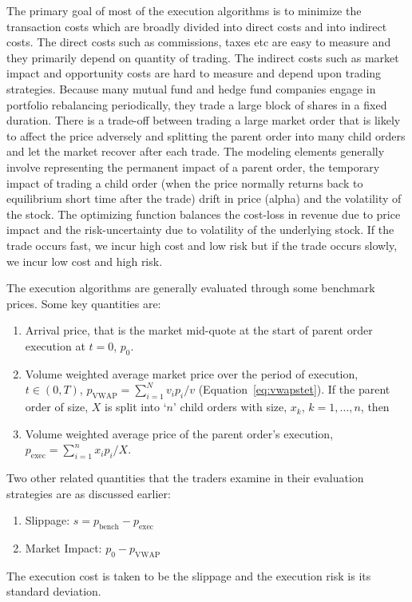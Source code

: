 The primary goal of most of the execution algorithms is to minimize the transaction costs which are broadly divided into direct costs and into indirect costs. The direct costs such as commissions, taxes etc are easy to measure and they primarily depend on quantity of trading. The indirect costs such as market impact and opportunity costs are hard to measure and depend upon trading strategies. Because many mutual fund and hedge fund companies engage in portfolio rebalancing periodically, they trade a large block of shares in a fixed duration. There is a trade-off between trading a large market order that is likely to affect the price adversely and splitting the parent order into many child orders and let the market recover after each trade. The modeling elements generally involve representing the permanent impact of a parent order, the temporary impact of trading a child order (when the price normally returns back to equilibrium short time after the trade) drift in price (alpha) and the volatility of the stock. The optimizing function balances the cost-loss in revenue due to price impact and the risk-uncertainty due to volatility of the underlying stock. If the trade occurs fast, we incur high cost and low risk but if the trade occurs slowly, we incur low cost and high risk.


The execution algorithms are generally evaluated through some benchmark prices. Some key quantities are:
	\begin{enumerate}[--]
	\item Arrival price, that is the market mid-quote at the start of parent order execution at $t= 0$, $p_0$.
	\item Volume weighted average market price over the period of execution, $t \in (0,T)$, $p_{\text{VWAP}}= \sum_{i=1}^N v_ip_i/v$ (Equation~\ref{eq:vwapstet}). \twomedskip
	If the parent order of size, $X$ is split into `$n$' child orders with size, $x_k$, $k=1,\ldots,n$, then
	\item Volume weighted average price of the parent order's execution, $p_{\text{exec}}= \sum_{i=1}^n x_ip_i/X$. 
	\end{enumerate}
	
Two other related quantities that the traders examine in their evaluation strategies are as discussed earlier:
	\begin{enumerate}[--]
	\item Slippage: $s= p_{\text{bench}} - p_{\text{exec}}$
	\item Market Impact: $p_0 - p_{\text{VWAP}}$
	\end{enumerate}
The execution cost is taken to be the slippage and the execution risk is its standard deviation. 


